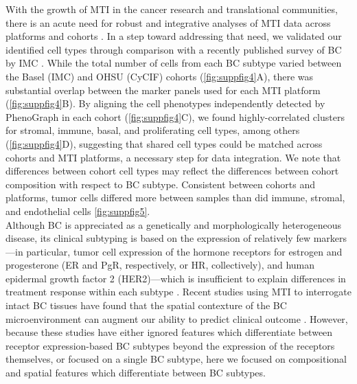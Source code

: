 \documentclass[preprint,review,3p,12pt]{elsarticle}
\begin{document}
With the growth of MTI in the cancer research and translational communities, there is an acute need for robust and integrative analyses of MTI data across platforms and cohorts \cite{htan2020}. In a step toward addressing that need, we validated our identified cell types through comparison with a recently published survey of BC by IMC \cite{jackson_single-cell_2020}. While the total number of cells from each BC subtype varied between the Basel (IMC) and OHSU (CyCIF) cohorts (\autoref{fig:suppfig4}A), there was substantial overlap between the marker panels used for each MTI platform (\autoref{fig:suppfig4}B). By aligning the cell phenotypes independently detected by PhenoGraph in each cohort (\autoref{fig:suppfig4}C), we found highly-correlated clusters for stromal, immune, basal, and proliferating cell types, among others (\autoref{fig:suppfig4}D), suggesting that shared cell types could be matched across cohorts and MTI platforms, a necessary step for data integration. We note that differences between cohort cell types may reflect the differences between cohort composition with respect to BC subtype. Consistent between cohorts and platforms, tumor cells differed more between samples than did immune, stromal, and endothelial cells \autoref{fig:suppfig5}. \\

Although BC is appreciated as a genetically and morphologically heterogeneous disease, its clinical subtyping is based on the expression of relatively few markers—in particular, tumor cell expression of the hormone receptors for estrogen and progesterone (ER and PgR, respectively, or HR, collectively), and human epidermal growth factor 2 (HER2)—which is insufficient to explain differences in treatment response within each subtype \cite{bcreview2015}. Recent studies using MTI to interrogate intact BC tissues have found that the spatial contexture of the BC microenvironment can augment our ability to predict clinical outcome \cite{keren2018, jackson_single-cell_2020}. However, because these studies have either ignored features which differentiate between receptor expression-based BC subtypes beyond the expression of the receptors themselves, or focused on a single BC subtype, here we focused on compositional and spatial features which differentiate between BC subtypes. \\
\end{document}
